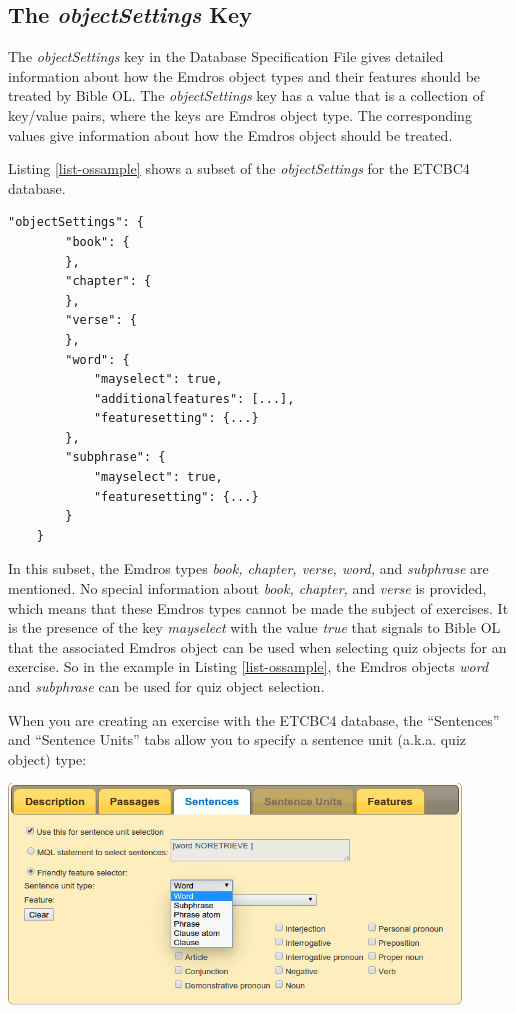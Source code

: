 \documentclass[11pt,oneside,a4paper]{memoir}
\begin{document}
\subsection{The \emph{objectSettings} Key}\label{sec-objectsettings}

The \emph{objectSettings} key in the Database Specification File gives detailed information about
how the Emdros object types and their features should be treated by Bible OL. The
\emph{objectSettings} key has a value that is a collection of key/value pairs, where the keys are
Emdros object type. The corresponding values give information about how the Emdros object should be
treated.

Listing \ref{list-ossample} shows a subset of the \emph{objectSettings} for the ETCBC4 database.

\begin{lstlisting}[caption=A sample objectSettings value,label=list-ossample]
    "objectSettings": {
        "book": {
        },
        "chapter": {
        },
        "verse": {
        },
        "word": {
            "mayselect": true,
            "additionalfeatures": [...],
            "featuresetting": {...}
        },
        "subphrase": {
            "mayselect": true,
            "featuresetting": {...}
        }
    }
\end{lstlisting}

In this subset, the Emdros types \emph{book, chapter, verse, word,} and \emph{subphrase} are
mentioned. No special information about \emph{book, chapter,} and \emph{verse} is provided, which
means that these Emdros types cannot be made the subject of exercises. It is the presence of the key
\emph{mayselect} with the value \emph{true} that signals to Bible OL that the associated Emdros
object can be used when selecting quiz objects for an exercise. So in the example in Listing
\ref{list-ossample}, the Emdros objects \emph{word} and \emph{subphrase} can be used for quiz object
selection.

When you are creating an exercise with the ETCBC4 database, the ``Sentences'' and ``Sentence Units''
tabs allow you to specify a sentence unit (a.k.a. quiz object) type:

\begin{center}
  \includegraphics[width=0.9\textwidth]{senselect.png}
\end{center}
\end{document}
